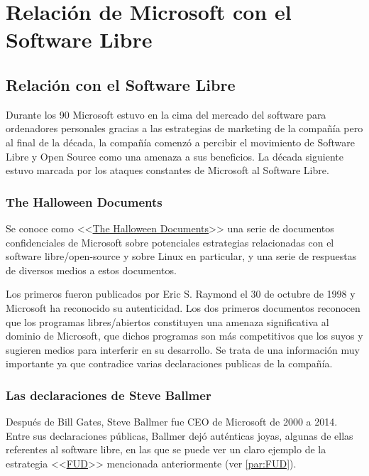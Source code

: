 \section{Relación de Microsoft con el Software Libre}
\subsection{Relación con el Software Libre}
Durante los 90 Microsoft estuvo en la cima del mercado del software para ordenadores personales gracias a las estrategias de marketing de la compañía pero al final de la década, la compañía comenzó a percibir el movimiento de Software Libre y Open Source como una amenaza a sus beneficios. La década siguiente estuvo marcada por los ataques constantes de Microsoft al Software Libre.\cite{wiki_2020:microsoft_and_open_source}

\subsubsection{The Halloween Documents}
Se conoce como <<\href{https://en.wikipedia.org/wiki/Halloween_documents}{The Halloween Documents}>> una serie de documentos confidenciales de Microsoft sobre potenciales estrategias relacionadas con el software libre/open-source y sobre Linux en particular, y una serie de respuestas de diversos medios a estos documentos.

Los primeros fueron publicados por Eric S. Raymond el 30 de octubre de 1998 y Microsoft ha reconocido su autenticidad. Los dos primeros documentos reconocen que los programas libres/abiertos constituyen una amenaza significativa al dominio de Microsoft, que dichos programas son más competitivos que los suyos y sugieren medios para interferir en su desarrollo. Se trata de una información muy importante ya que contradice varias declaraciones publicas de la compañía. \cite{wiki_2020:halloween_documents}

\subsubsection{Las declaraciones de Steve Ballmer}
Después de Bill Gates, Steve Ballmer fue CEO de Microsoft de 2000 a 2014. Entre sus declaraciones públicas, Ballmer dejó auténticas joyas, algunas de ellas referentes al software libre, en las que se puede ver un claro ejemplo de la estrategia <<\href{https://en.wikipedia.org/wiki/Fear,_uncertainty,_and_doubt}{FUD}>> mencionada anteriormente (ver \ref{par:FUD}).

